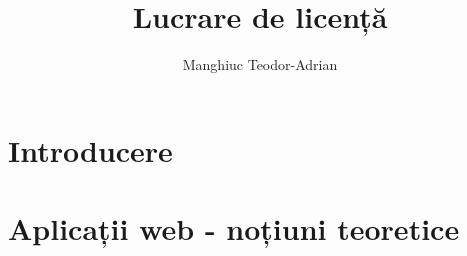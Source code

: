\documentclass[12pt, twoside]{report}
\title{Lucrare de licență}
\author{Manghiuc Teodor-Adrian}
\date{}
\begin{document}
	
	
	
	
	
	\chapter{Introducere}
	
	
	\chapter{Aplicații web - noțiuni teoretice}
	
	
	
	
\end{document}
